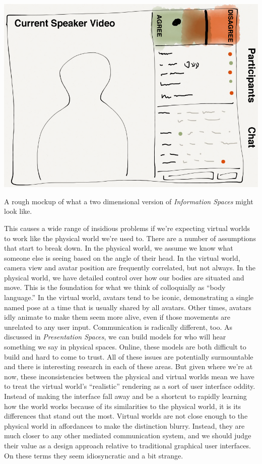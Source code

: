 \begin{marginfigure}
	\includegraphics{figures/2d-info-spaces-mockup.png}
	\caption{A rough mockup of what a two dimensional version of \emph{Information Spaces} might look like.}
	\label{fig:infospaces_demake}
\end{marginfigure}


This causes a wide range of insidious problems if we're expecting virtual worlds to work like the physical world we're used to. There are a number of assumptions that start to break down. In the physical world, we assume we know what someone else is seeing based on the angle of their head. In the virtual world, camera view and avatar position are frequently correlated, but not always. In the physical world, we have detailed control over how our bodies are situated and move. This is the foundation for what we think of colloquially as ``body language.'' In the virtual world, avatars tend to be iconic, demonstrating a single named pose at a time that is usually shared by all avatars. Other times, avatars idly animate to make them seem more alive, even if those movements are unrelated to any user input. Communication is radically different, too. As discussed in \emph{Presentation Spaces}, we can build models for who will hear something we say in physical spaces. Online, these models are both difficult to build and hard to come to trust. All of these issues are potentially surmountable and there is interesting research in each of these areas. But given where we're at now, these inconsistencies between the physical and virtual worlds mean we have to treat the virtual world's ``realistic'' rendering as a sort of user interface oddity. Instead of making the interface fall away and be a shortcut to rapidly learning how the world works because of its similarities to the physical world, it is its differences that stand out the most. Virtual worlds are not close enough to the physical world in affordances to make the distinction blurry. Instead, they are much closer to any other mediated communication system, and we should judge their value as a design approach relative to traditional graphical user interfaces. On these terms they seem idiosyncratic and a bit strange.


